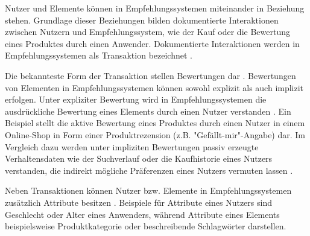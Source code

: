 Nutzer und Elemente können in Empfehlungssystemen miteinander in Beziehung stehen.
Grundlage dieser Beziehungen bilden dokumentierte Interaktionen zwischen Nutzern und Empfehlungssystem, wie der Kauf oder die Bewertung eines Produktes durch einen Anwender.
Dokumentierte Interaktionen werden in Empfehlungssystemen als Transaktion bezeichnet \cite[S. 9]{ricci:inbook}.

Die bekannteste Form der Transaktion stellen Bewertungen dar \cite[S. 9]{ricci:inbook}.
Bewertungen von Elementen in Empfehlungssystemen können sowohl explizit als auch implizit erfolgen.
Unter expliziter Bewertung wird in Empfehlungssystemen die ausdrückliche Bewertung eines Elements durch einen Nutzer verstanden \cite[S. 9]{ricci:inbook}.
Ein Beispiel stellt die aktive Bewertung eines Produktes durch einen Nutzer in einem Online-Shop in Form einer Produktrezension (z.B. "Gefällt-mir"-Angabe) dar.
Im Vergleich dazu werden unter impliziten Bewertungen passiv erzeugte Verhaltensdaten wie der Suchverlauf oder die Kaufhistorie eines Nutzers verstanden, die indirekt mögliche Präferenzen eines Nutzers vermuten lassen \cite[S. 149]{jadidinejad:inproceedings}\cite[S. 403]{unternährer:article}.

Neben Transaktionen können Nutzer bzw. Elemente in Empfehlungssystemen zusätzlich Attribute besitzen \cite[S. 8]{recommenderSystems:2016}\cite[S. 735]{adomavicius:inproceedings}.
Beispiele für Attribute eines Nutzers sind Geschlecht oder Alter eines Anwenders, während Attribute eines Elements beispielsweise Produktkategorie oder beschreibende Schlagwörter darstellen.

